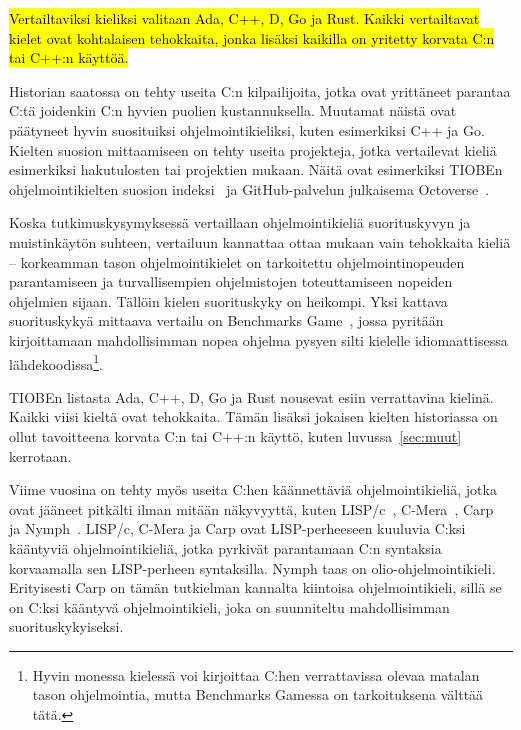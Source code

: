\hl{Vertailtaviksi kieliksi valitaan Ada, C++, D, Go ja Rust. Kaikki
vertailtavat kielet ovat kohtalaisen tehokkaita, jonka lisäksi kaikilla on
yritetty korvata C:n tai C++:n käyttöä.}

Historian saatossa on tehty useita C:n kilpailijoita, jotka ovat yrittäneet
parantaa C:tä joidenkin C:n hyvien puolien kustannuksella. Muutamat näistä ovat
päätyneet hyvin suosituiksi ohjelmointikieliksi, kuten esimerkiksi C++ ja Go.
Kielten suosion mittaamiseen on tehty useita projekteja, jotka vertailevat
kieliä esimerkiksi hakutulosten tai projektien mukaan. Näitä ovat esimerkiksi
TIOBEn ohjelmointikielten suosion indeksi~\citep{tiobe} ja GitHub-palvelun
julkaisema \mbox{Octoverse}~\citep{octoverse}.

Koska tutkimuskysymyksessä vertaillaan ohjelmointikieliä suorituskyvyn ja
muistinkäytön suhteen, vertailuun kannattaa ottaa mukaan vain tehokkaita kieliä
-- korkeamman tason ohjelmointikielet on tarkoitettu ohjelmointinopeuden
parantamiseen ja turvallisempien ohjelmistojen toteuttamiseen nopeiden
ohjelmien sijaan. Tällöin kielen suorituskyky on heikompi. Yksi kattava
suorituskykyä mittaava vertailu on Benchmarks Game~\citep{benchmarks}, jossa
pyritään kirjoittamaan mahdollisimman nopea ohjelma pysyen silti kielelle
idiomaattisessa lähdekoodissa\footnote{Hyvin monessa kielessä voi kirjoittaa
C:hen verrattavissa olevaa matalan tason ohjelmointia, mutta Benchmarks Gamessa
on tarkoituksena välttää tätä.}.

TIOBEn listasta Ada, C++, D, Go ja Rust nousevat esiin verrattavina kielinä.
Kaikki viisi kieltä ovat tehokkaita. Tämän lisäksi jokaisen kielten historiassa
on ollut tavoitteena korvata C:n tai C++:n käyttö, kuten luvussa~\ref{sec:muut}
kerrotaan.

Viime vuosina on tehty myös useita C:hen käännettäviä ohjelmointikieliä, jotka
ovat jääneet pitkälti ilman mitään näkyvyyttä, kuten LISP/c~\citep{clisp1},
C-Mera~\citep{clisp2}, Carp~\citep{clisp3} ja Nymph~\citep{nymph}. LISP/c,
C-Mera ja Carp ovat LISP-perheeseen kuuluvia C:ksi kääntyviä ohjelmointikieliä,
jotka pyrkivät parantamaan C:n syntaksia korvaamalla sen LISP-perheen
syntaksilla. Nymph taas on olio-ohjelmointikieli. Erityisesti Carp on tämän
tutkielman kannalta kiintoisa ohjelmointikieli, sillä se on C:ksi kääntyvä
ohjelmointikieli, joka on suunniteltu mahdollisimman suorituskykyiseksi.

